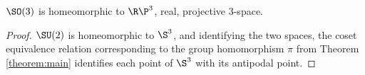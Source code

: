 \documentclass[oneside,12pt]{amsart}
\begin{document}
\begin{corollary}
$\SO(3)$ is homeomorphic to $\R\P^3$, real, projective 3-space.
\end{corollary}
\begin{proof}
$\SU(2)$ is homeomorphic to $\S^3$, and identifying the two spaces, the coset equivalence relation
corresponding to the group homomorphism $\pi$ from Theorem \ref{theorem:main} identifies each point of $\S^3$ with
its antipodal point.
\end{proof}




\end{document}

